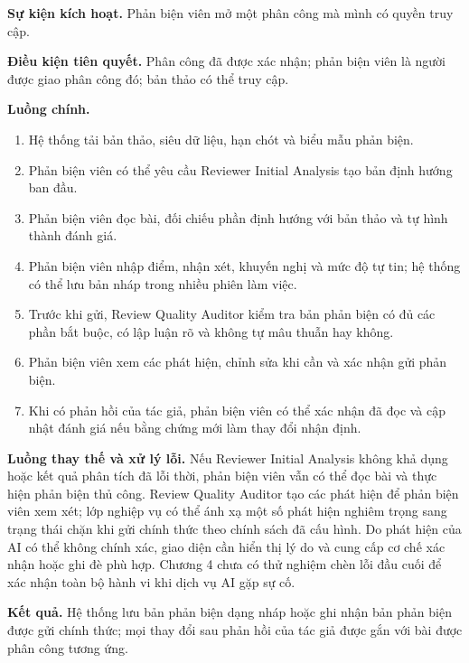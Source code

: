 \textbf{Sự kiện kích hoạt.} Phản biện viên mở một phân công mà mình có quyền truy cập.

\textbf{Điều kiện tiên quyết.} Phân công đã được xác nhận; phản biện viên là người được giao phân công đó; bản thảo có thể truy cập.

\textbf{Luồng chính.}

\begin{enumerate}
  \item Hệ thống tải bản thảo, siêu dữ liệu, hạn chót và biểu mẫu phản biện.
  \item Phản biện viên có thể yêu cầu Reviewer Initial Analysis tạo bản định hướng ban đầu.
  \item Phản biện viên đọc bài, đối chiếu phần định hướng với bản thảo và tự hình thành đánh giá.
  \item Phản biện viên nhập điểm, nhận xét, khuyến nghị và mức độ tự tin; hệ thống có thể lưu bản nháp trong nhiều phiên làm việc.
  \item Trước khi gửi, Review Quality Auditor kiểm tra bản phản biện có đủ các phần bắt buộc, có lập luận rõ và không tự mâu thuẫn hay không.
  \item Phản biện viên xem các phát hiện, chỉnh sửa khi cần và xác nhận gửi phản biện.
  \item Khi có phản hồi của tác giả, phản biện viên có thể xác nhận đã đọc và cập nhật đánh giá nếu bằng chứng mới làm thay đổi nhận định.
\end{enumerate}

\textbf{Luồng thay thế và xử lý lỗi.} Nếu Reviewer Initial Analysis không khả dụng hoặc kết quả phân tích đã lỗi thời, phản biện viên vẫn có thể đọc bài và thực hiện phản biện thủ công. Review Quality Auditor tạo các phát hiện để phản biện viên xem xét; lớp nghiệp vụ có thể ánh xạ một số phát hiện nghiêm trọng sang trạng thái chặn khi gửi chính thức theo chính sách đã cấu hình. Do phát hiện của AI có thể không chính xác, giao diện cần hiển thị lý do và cung cấp cơ chế xác nhận hoặc ghi đè phù hợp. Chương 4 chưa có thử nghiệm chèn lỗi đầu cuối để xác nhận toàn bộ hành vi khi dịch vụ AI gặp sự cố.

\textbf{Kết quả.} Hệ thống lưu bản phản biện dạng nháp hoặc ghi nhận bản phản biện được gửi chính thức; mọi thay đổi sau phản hồi của tác giả được gắn với bài được phân công tương ứng.

